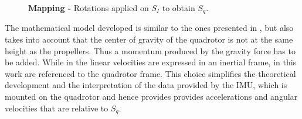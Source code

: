 \documentclass[conference]{IEEEtran}
\begin{document}
\begin{figure}[h!]
  \centering
  \vspace{-20pt}
  \caption{\textbf{Mapping -} Rotations applied on $S_I$ to obtain $S_q$.}
  \label{fig:rotaciones}
\end{figure}

The mathematical model developed is similar to the ones presented in \cite{bib:quadrotor-bible, bib:curso_quad}, but also takes into account that the center of gravity of the quadrotor is not at the same height as the propellers. Thus a momentum produced by the gravity force has to be added. While in \cite{bib:curso_quad} the linear velocities are expressed in an inertial frame, in this work are referenced to the quadrotor frame. This choice simplifies the theoretical development and the interpretation of the data provided by the IMU, which is mounted on the quadrotor and hence provides provides accelerations and angular velocities that are relative to $S_q$.
\end{document}
